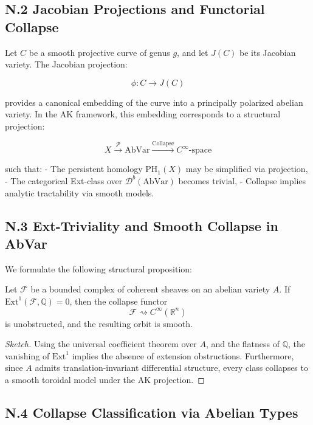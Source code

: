\documentclass[11pt]{article}
\begin{document}
\begin{axiom}
\begin{axiom}
{{\subsection*{N.2 Jacobian Projections and Functorial Collapse}

Let \( C \) be a smooth projective curve of genus \( g \), and let \( J(C) \) be its Jacobian variety.  
The Jacobian projection:

\[
\phi: C \longrightarrow J(C)
\]

provides a canonical embedding of the curve into a principally polarized abelian variety.  
In the AK framework, this embedding corresponds to a structural projection:

\[
X \xrightarrow{\mathcal{P}} \mathrm{AbVar} \xrightarrow{\text{Collapse}} C^\infty\text{-space}
\]

such that:
- The persistent homology \( \mathrm{PH}_1(X) \) may be simplified via projection,
- The categorical Ext-class over \( \mathcal{D}^b(\mathrm{AbVar}) \) becomes trivial,
- Collapse implies analytic tractability via smooth models.

\subsection*{N.3 Ext-Triviality and Smooth Collapse in AbVar}

We formulate the following structural proposition:

\begin{proposition}
Let \( \mathcal{F} \) be a bounded complex of coherent sheaves on an abelian variety \( A \).  
If \( \mathrm{Ext}^1(\mathcal{F}, \mathbb{Q}) = 0 \), then the collapse functor
\[
\mathcal{F} \rightsquigarrow C^\infty(\mathbb{R}^n)
\]
is unobstructed, and the resulting orbit is smooth.
\end{proposition}

\begin{proof}[Sketch]
Using the universal coefficient theorem over \( A \), and the flatness of \( \mathbb{Q} \), the vanishing of \( \mathrm{Ext}^1 \) implies the absence of extension obstructions.  
Furthermore, since \( A \) admits translation-invariant differential structure, every class collapses to a smooth toroidal model under the AK projection.
\end{proof}

\subsection*{N.4 Collapse Classification via Abelian Types}

}}
\end{axiom}
\end{axiom}
\end{document}
